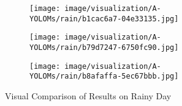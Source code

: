 \documentclass[lettersize,journal]{IEEEtran}
\begin{document}
\begin{figure*}[!h]
    \begin{subfigure}[b]{0.05\textwidth}
        \centering
        \vspace{0.1cm}
    \end{subfigure}\begin{subfigure}{0.25\textwidth}
        \centering
        \texttt{[image: image/visualization/A-YOLOMs/rain/b1cac6a7-04e33135.jpg]}
    \end{subfigure}\hspace{0.5cm}
    \begin{subfigure}{0.25\textwidth}
        \centering
        \texttt{[image: image/visualization/A-YOLOMs/rain/b79d7247-6750fc90.jpg]}
    \end{subfigure}\hspace{0.5cm}
    \begin{subfigure}{0.25\textwidth}
        \centering
        \texttt{[image: image/visualization/A-YOLOMs/rain/b8afaffa-5ec67bbb.jpg]}
    \end{subfigure}
    \caption{Visual Comparison of Results on Rainy Day}
    \label{fig:rainy_day_comparison}
\end{figure*}
\end{document}
